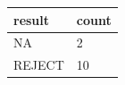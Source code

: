 \begin{tabular}{ll}
 \hline
result & count \\
 \hline
NA & 2 \\
REJECT & 10 \\
 \hline
\end{tabular}
